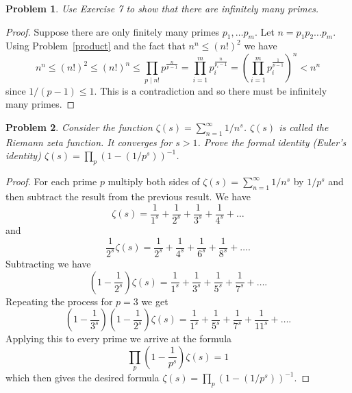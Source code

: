 \documentclass{article}
\newtheorem{problem}{Problem}
\begin{document}
\begin{problem}
Use Exercise 7 to show that there are infinitely many primes.
\end{problem}
\begin{proof}
Suppose there are only finitely many primes $p_1, \dots p_m$. Let $n = p_1p_2 \dots p_m$. Using Problem~\ref{product} and the fact that $n^n \leq (n!)^2$ we have
\[
n^n \leq (n!)^2 \leq (n!)^n \leq \prod_{p \mid n!} p^{\frac{n}{p-1}} = \prod_{i=1}^{m} p_i^{\frac{n}{p_i-1}} = \left ( \prod_{i=1}^{m} p_i^{\frac{1}{p-1}} \right )^n < n^n
\]
since $1/(p-1) \leq 1$. This is a contradiction and so there must be infinitely many primes.
\end{proof}

\begin{problem}
\label{zeta}
Consider the function $\zeta(s) = \sum_{n=1}^{\infty} 1/n^s$. $\zeta(s)$ is called the Riemann zeta function. It converges for $s > 1$. Prove the formal identity (Euler's identity) $\zeta(s) = \prod_p (1-(1/p^s))^{-1}$.
\end{problem}
\begin{proof}
For each prime $p$ multiply both sides of $\zeta(s) = \sum_{n=1}^{\infty} 1/n^s$ by $1/p^s$ and then subtract the result from the previous result. We have
\[
\zeta(s) = \frac{1}{1^s} + \frac{1}{2^s} + \frac{1}{3^s} + \frac{1}{4^s} + \dots
\]
and
\[
\frac{1}{2^s} \zeta(s) = \frac{1}{2^s} + \frac{1}{4^s} + \frac{1}{6^s} + \frac{1}{8^s} + \dots.
\]
Subtracting we have
\[
\left (1 - \frac{1}{2^s} \right ) \zeta(s) = \frac{1}{1^s} + \frac{1}{3^s} + \frac{1}{5^s} + \frac{1}{7^s} + \dots.
\]
Repeating the process for $p=3$ we get
\[
\left (1 - \frac{1}{3^s} \right ) \left ( 1 - \frac{1}{2^s} \right ) \zeta(s) = \frac{1}{1^s} + \frac{1}{5^s} + \frac{1}{7^s} + \frac{1}{11^s} + \dots.
\]
Applying this to every prime we arrive at the formula
\[
\prod_p \left (1 - \frac{1}{p^s} \right ) \zeta (s) = 1
\]
which then gives the desired formula $\zeta(s) = \prod_p (1-(1/p^s))^{-1}$.
\end{proof}
\end{document}
